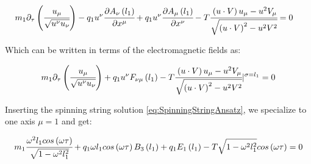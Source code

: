 \documentclass[11pt,a4paper]{article}
\begin{document}
\begin{align*}
&m_{1}\partial_{\tau}\left(\cfrac{u_{\mu}}{\sqrt{u^{\nu}u_{\nu}}}\right)
-q_{1}u^{\nu}\cfrac{\partial A_{\nu}\left(l_{1}\right)}{\partial x^{\mu}}
+q_{1}u^{\nu}\cfrac{\partial A_{\mu}\left(l_{1}\right)}{\partial x^{\nu}}-T\cfrac{\left(u\cdot V\right)u_{\mu}-u^{2}V_{\mu}}{\sqrt{\left(u\cdot V\right)^{2}-u^{2}V^{2}}}=0
\end{align*}

Which can be written in terms of the electromagnetic fields as:

\begin{equation*}
m_{1}\partial_{\tau}\left(\cfrac{u_{\mu}}{\sqrt{u^{\nu}u_{\nu}}}\right)+q_{1}u^{\nu}F_{\nu\mu}\left(l_{1}\right)-T\cfrac{\left(u\cdot V\right)u_{\mu}-u^{2}V_{\mu}}{\sqrt{\left(u\cdot V\right)^{2}-u^{2}V^{2}}}|^{\sigma=l_{1}}=0
\end{equation*}

Inserting the spinning string solution \ref{eq:SpinningStringAnsatz}, we specialize to one axis $\mu=1$ and get:

\begin{equation}
m_{1}\cfrac{\omega^{2}l_{1}cos\left(\omega\tau\right)}{\sqrt{1-\omega^{2}l_{1}^{2}}}+q_{1}\omega l_{1}cos\left(\omega\tau\right)B_{3}\left(l_{1}\right)+q_{1}E_{1}\left(l_{1}\right)-T\sqrt{1-\omega^{2}l_{1}^{2}}cos\left(\omega\tau\right)=0
\end{equation}
\end{document}
